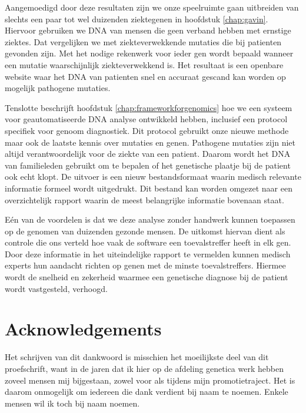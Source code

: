\begin{appendices}
	Aangemoedigd door deze resultaten zijn we onze speelruimte gaan uitbreiden van slechts een paar tot wel duizenden ziektegenen in hoofdstuk \ref{chap:gavin}.
	Hiervoor gebruiken we DNA van mensen die geen verband hebben met ernstige ziektes.
	Dat vergelijken we met ziekteverwekkende mutaties die bij patienten gevonden zijn.
	Met het nodige rekenwerk voor ieder gen wordt bepaald wanneer een mutatie waarschijnlijk ziekteverwekkend is.
	Het resultaat is een openbare website waar het DNA van patienten snel en accuraat gescand kan worden op mogelijk pathogene mutaties.
	
	Tenslotte beschrijft hoofdstuk \ref{chap:frameworkforgenomics} hoe we een systeem voor geautomatiseerde DNA analyse ontwikkeld hebben, inclusief een protocol specifiek voor genoom diagnostiek.
	Dit protocol gebruikt onze nieuwe methode maar ook de laatste kennis over mutaties en genen.
	Pathogene mutaties zijn niet altijd verantwoordelijk voor de ziekte van een patient.
	Daarom wordt het DNA van familieleden gebruikt om te bepalen of het genetische plaatje bij de patient ook echt klopt.
	De uitvoer is een nieuw bestandsformaat waarin medisch relevante informatie formeel wordt uitgedrukt.
	Dit bestand kan worden omgezet naar een overzichtelijk rapport waarin de meest belangrijke informatie bovenaan staat.
	
	Eén van de voordelen is dat we deze analyse zonder handwerk kunnen toepassen op de genomen van duizenden gezonde mensen.
	De uitkomst hiervan dient als controle die ons verteld hoe vaak de software een toevalstreffer heeft in elk gen.
	Door deze informatie in het uiteindelijke rapport te vermelden kunnen medisch experts hun aandacht richten op genen met de minste toevalstreffers.
	Hiermee wordt de snelheid en zekerheid waarmee een genetische diagnose bij de patient wordt vastgesteld, verhoogd.
	
	\chapter{Acknowledgements}
	
	Het schrijven van dit dankwoord is misschien het moeilijkste deel van dit proefschrift, want in de jaren dat ik hier op de afdeling genetica werk hebben zoveel mensen mij bijgestaan, zowel voor als tijdens mijn promotietraject. Het is daarom onmogelijk om iedereen die dank verdient bij naam te noemen. Enkele mensen wil ik toch bij naam noemen.\\
	

\end{appendices}
